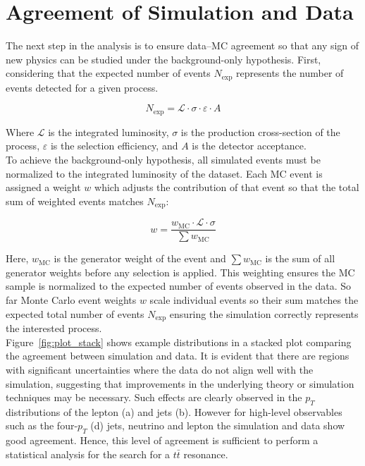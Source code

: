     




    \section{Agreement of Simulation and Data}
    
    The next step in the analysis is to ensure data–MC agreement so that any sign of new physics can be studied under the background-only hypothesis. First, considering that the expected number of events \( N_{\text{exp}} \) represents the number of events detected for a given process.

    \begin{equation}
     N_{\text{exp}} = \mathcal{L} \cdot \sigma \cdot \varepsilon \cdot A
    \label{eq:nexp}
    \end{equation}

    Where \(\mathcal{L}\) is the integrated luminosity, \(\sigma\) is the production cross-section of the process, \(\varepsilon\) is the selection efficiency, and \(A\) is the detector acceptance.
    \\
    
    To achieve the background-only hypothesis, all simulated events must be normalized to the integrated luminosity of the dataset. Each MC event is assigned a weight \( w \) which adjusts the contribution of that event so that the total sum of weighted events matches \( N_{\text{exp}} \):

    \begin{equation}
    w = \frac{w_{\text{MC}} \cdot \mathcal{L} \cdot \sigma}{\sum w_{\text{MC}}}
    \label{eq:weight}
    \end{equation}

Here, \( w_{\text{MC}} \) is the generator weight of the event and \(\sum w_{\text{MC}} \) is the sum of all generator weights before any selection is applied. This weighting ensures the MC sample is normalized to the expected number of events observed in the data. 
So far Monte Carlo event weights \( w \) scale individual events so their sum matches the expected total number of events \( N_{\text{exp}} \) ensuring the simulation correctly represents the interested process.
\\

Figure~\ref{fig:plot_stack} shows example distributions in a stacked plot comparing the agreement between simulation and data. It is evident that there are regions with significant uncertainties where the data do not align well with the simulation, suggesting that improvements in the underlying theory or simulation techniques may be necessary. Such effects are clearly observed in the \(p_T\) distributions of the lepton (a) and jets (b). However for high-level observables such as the four-\(p_T\) (d) jets, neutrino and lepton the simulation and data show good agreement. Hence, this level of agreement is sufficient to perform a statistical analysis for the search for a \(t\bar{t}\) resonance.
\\

